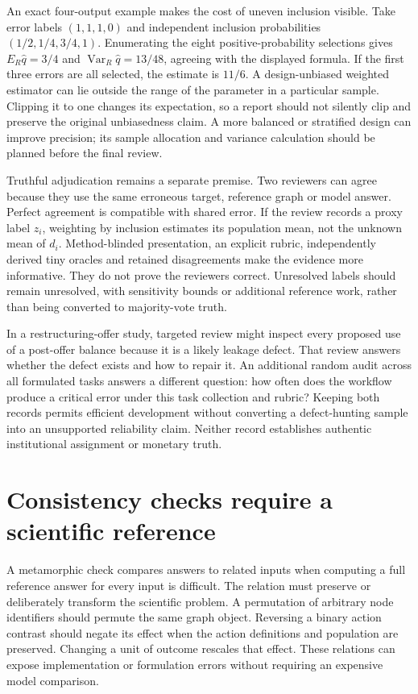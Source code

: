 An exact four-output example makes the cost of uneven inclusion visible.
Take error labels \((1,1,1,0)\) and independent inclusion probabilities
\((1/2,1/4,3/4,1)\). Enumerating the eight positive-probability selections
gives \(E_R\widehat q=3/4\) and
\(\operatorname{Var}_R\widehat q=13/48\), agreeing with the displayed
formula. If the first three errors are all selected, the estimate is
\(11/6\). A design-unbiased weighted estimator can lie outside the range
of the parameter in a particular sample. Clipping it to one changes its
expectation, so a report should not silently clip and preserve the original
unbiasedness claim. A more balanced or stratified design can improve
precision; its sample allocation and variance calculation should be planned
before the final review.
\citep{exec14_l7_exact}

Truthful adjudication remains a separate premise. Two reviewers can agree
because they use the same erroneous target, reference graph or model
answer. Perfect agreement is compatible with shared error. If the review
records a proxy label \(z_i\), weighting by inclusion estimates its population
mean, not the unknown mean of \(d_i\). Method-blinded presentation, an
explicit rubric, independently derived tiny oracles and retained
disagreements make the evidence more informative. They do not prove the
reviewers correct. Unresolved labels should remain unresolved, with
sensitivity bounds or additional reference work, rather than being converted
to majority-vote truth.

In a restructuring-offer study, targeted review might inspect every proposed
use of a post-offer balance because it is a likely leakage defect. That
review answers whether the defect exists and how to repair it. An additional
random audit across all formulated tasks answers a different question:
how often does the workflow produce a critical error under this task
collection and rubric? Keeping both records permits efficient development
without converting a defect-hunting sample into an unsupported reliability
claim. Neither record establishes authentic institutional assignment or
monetary truth.

\section{Consistency checks require a scientific reference}
\label{exec14:l7-metamorphic}

A metamorphic check compares answers to related inputs when computing a full
reference answer for every input is difficult. The relation must preserve
or deliberately transform the scientific problem. A permutation of arbitrary
node identifiers should permute the same graph object. Reversing a binary
action contrast should negate its effect when the action definitions and
population are preserved. Changing a unit of outcome rescales that effect.
These relations can expose implementation or formulation errors without
requiring an expensive model comparison.

